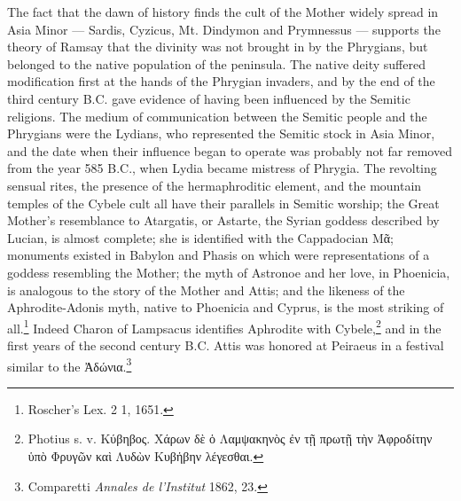 \documentclass[a4paper, 11pt, oneside, polutonikogreek, english]{article}
\begin{document}
The fact that the dawn of history finds the cult of the Mother widely spread in Asia Minor --- Sardis, Cyzicus, Mt. Dindymon and Prymnessus --- supports the theory of Ramsay that the divinity was not brought in by the Phrygians, but belonged to the native population of the peninsula. The native deity suffered modification first at the hands of the Phrygian invaders, and by the end of the third century \textsc{B.C.} gave evidence of having been influenced by the Semitic religions. The medium of communication between the Semitic people and the Phrygians were the Lydians, who represented the Semitic stock in Asia Minor, and the date when their influence began to operate was probably not far removed from the year 585 \textsc{B.C.}, when Lydia became mistress of Phrygia. The revolting sensual rites, the presence of the hermaphroditic element, and the mountain temples of the Cybele cult all have their parallels in Semitic worship; the Great Mother's resemblance to Atargatis, or Astarte, the Syrian goddess described by Lucian, is almost complete; she is identified with the Cappadocian Μᾶ; monuments existed in Babylon and Phasis on which were representations of a goddess resembling the Mother; the myth of Astronoe and her love, in Phoenicia, is analogous to the story of the Mother and Attis; and the likeness of the Aphrodite-Adonis myth, native to Phoenicia and Cyprus, is the most striking of all.\footnote{Roscher's Lex. 2 1, 1651.} Indeed Charon of Lampsacus identifies Aphrodite with Cybele,\footnote{Photius s. v. Κύβηβος. Χάρων δὲ ὁ Λαμψακηνὸς ἐν τῇ πρωτῇ τὴν Ἀφροδίτην ὑπὸ Φρυγῶν καὶ Λυδὼν Κυβἡβην λέγεσθαι.} and in the first years of the second century \textsc{B.C.} Attis was honored at Peiraeus in a festival similar to the Ἀδώνια.\footnote{Comparetti \emph{Annales de l'Institut} 1862, 23.}
 
\end{document}
